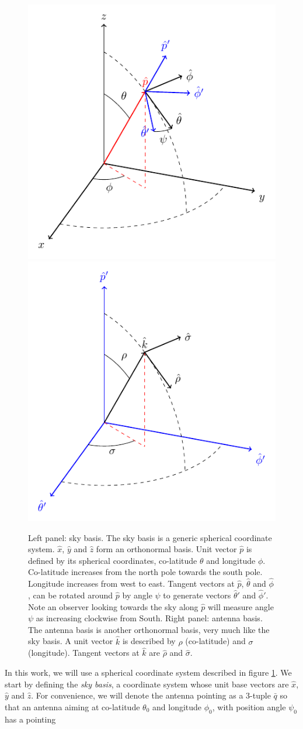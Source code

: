 \documentclass[a4paper,11pt]{article}
\begin{document}
\begin{figure}
	\centering
	\includegraphics[width=0.47\linewidth]{tikz/sky_basis}	
	\includegraphics[width=0.47\linewidth]{tikz/beam_basis}
	\caption{Left panel: sky basis. The sky basis is a generic spherical coordinate system. $\hat{x}$, $\hat{y}$ and $\hat{z}$ form an orthonormal basis. Unit vector $\hat{p}$ is defined by its spherical coordinates, co-latitude $\theta$ and longitude $\phi$. Co-latitude increases from the north pole towards the south pole. Longitude increases from west to east. Tangent vectors at $\hat{p}$, $\hat{\theta}$ and $\hat{\phi}$, can be rotated around $\hat{p}$ by angle $\psi$ to generate vectors $\hat{\theta}'$ and $\hat{\phi}'$. Note an observer looking towards the sky along $\hat{p}$ will measure angle $\psi$ as increasing clockwise from South. Right panel: antenna basis. The antenna basis is another orthonormal basis, very much like the sky basis. A unit vector $\hat{k}$ is described by $\rho$ (co-latitude) and $\sigma$ (longitude). Tangent vectors at $\hat{k}$ are $\hat{\rho}$ and $\hat{\sigma}$. }
	\label{fig::sky_basis} 
\end{figure}

In this work, we will use a spherical coordinate system described in figure \ref{fig::sky_basis}. We start by defining the \textsl{sky basis}, a coordinate system whose unit base vectors are $\hat{x}$, $\hat{y}$ and $\hat{z}$. For convenience, we will denote the antenna pointing as a 3-tuple $\bar{q}$ so that an antenna aiming at co-latitude $\theta_0$ and longitude $\phi_0$, with position angle $\psi_0$ has a pointing 
\end{document}
